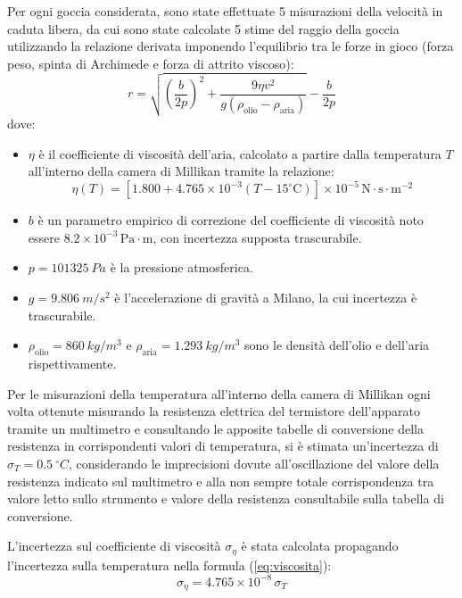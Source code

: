 \documentclass[a4paper,12pt]{article}
\begin{document}
Per ogni goccia considerata, sono state effettuate 5 misurazioni della velocità in caduta libera, da cui sono state calcolate 5 stime del raggio della goccia utilizzando la relazione derivata imponendo l'equilibrio tra le forze in gioco (forza peso, spinta di Archimede e forza di attrito viscoso):
\begin{equation}
r= \sqrt{\left( \frac{b}{2p} \right)^2+ \frac{9 \eta v^2}{g(\rho_{\text{olio}} - \rho_{\text{aria}})}} - \frac{b}{2p}
\label{eq:raggio_goccia}
\end{equation}
dove:
\begin{itemize}
\item \( \eta \) è il coefficiente di viscosità dell'aria, calcolato a partire dalla temperatura \( T \) all'interno della camera di Millikan tramite la relazione:
\begin{equation}
\eta(T) = [1.800 + 4.765 \times 10^{-3} (T - 15^\circ \text{C})] \times 10^{-5} \, \text{N}\cdot\text{s}\cdot\text{m}^{-2}
\label{eq:viscosita}
\end{equation}
\item \( b \) è un parametro empirico di correzione del coefficiente di viscosità noto essere \( 8.2 \times 10^{-3} \, \text{Pa} \cdot \text{m} \), con incertezza supposta trascurabile.
\item \( p = \SI{101325}{Pa} \) è la pressione atmosferica.
\item \( g = \SI{9.806}{m/s^2} \) è l'accelerazione di gravità a Milano, la cui incertezza è trascurabile.
\item \( \rho_{\text{olio}} = \SI{860}{kg/m^3} \) e \( \rho_{\text{aria}} = \SI{1.293}{kg/m^3} \) sono le densità dell'olio e dell'aria rispettivamente.
\end{itemize}

Per le misurazioni della temperatura all’interno della camera di Millikan ogni volta ottenute misurando la resistenza elettrica del termistore dell’apparato tramite un multimetro e consultando le apposite tabelle di conversione della resistenza in corrispondenti valori di temperatura, si è stimata un’incertezza di \( \sigma_T = \SI{0.5}{^\circ C} \), considerando le imprecisioni dovute all’oscillazione del valore della resistenza indicato sul multimetro e alla non sempre totale corrispondenza tra valore letto sullo strumento e valore della resistenza consultabile sulla tabella di conversione. 

L'incertezza sul coefficiente di viscosità \( \sigma_{\eta} \) è stata calcolata propagando l'incertezza sulla temperatura nella formula (\ref{eq:viscosita}):
\begin{equation}
\sigma_{\eta} = 4.765 \times 10^{-8} \, \sigma_T
\label{eq:incertezza_viscosita}
\end{equation}
\end{document}
